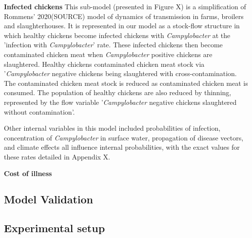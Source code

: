 \textbf{Infected chickens}
This sub-model (presented in Figure X) is a simplification of Rommens' 2020(SOURCE) model of dynamics of transmission in farms, broilers and slaughterhouses. It is represented in our model as a stock-flow structure in which healthy chickens become infected chickens with \textit{Campylobacter} at the 'infection with \textit{Campylobacter}' rate. These infected chickens then become contaminated chicken meat when \textit{Campylobacter} positive chickens are slaughtered. Healthy chickens  contaminated chicken meat stock via '\textit{Campylobacter} negative chickens being slaughtered with cross-contamination. The contaminated chicken meat stock is reduced as contaminated chicken meat is consumed. The population of healthy chickens are also reduced by thinning, represented by the flow variable '\textit{Campylobacter} negative chickens slaughtered without contamination'.

Other internal variables in this model included probabilities of infection, concentration of \textit{Campylobacter} in surface water, propagation of disease vectors, and climate effects all influence internal probabilities, with the exact values for these rates detailed in Appendix X.


\textbf{Cost of illness}

\subsection{Model Validation}
    
\subsection{Experimental setup}



